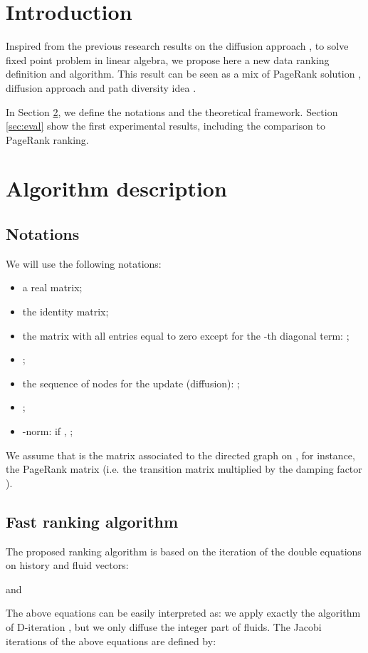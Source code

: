 \documentclass[conference]{IEEEtran}
\begin{document}
\begin{psfrags}
\section{Introduction}\label{sec:intro}
Inspired from the previous research results on the diffusion approach \cite{d-algo}, \cite{cv}
to solve fixed point problem in linear algebra, we propose here a new data ranking definition
and algorithm. This result can be seen as a mix of PageRank solution \cite{page}, diffusion approach
\cite{d-algo} and path diversity idea \cite{diversity}.

In Section \ref{sec:def}, we define the notations and the theoretical framework. 
Section \ref{sec:eval} show the first experimental results, including the comparison
to PageRank ranking.
\section{Algorithm description}\label{sec:def}
\subsection{Notations}

We will use the following notations:
\begin{itemize}
\item  a real matrix;
\item  the identity matrix;
\item  the matrix with all entries equal to zero except for
  the -th diagonal term: ;
\item ;
\item  the sequence of nodes for the update
  (diffusion): ;
\item ;
\item -norm: if , ;
\end{itemize}

We assume that  is the matrix associated to the directed graph on ,
for instance, the PageRank matrix (i.e. the transition matrix multiplied by the
damping factor \cite{page}).

\subsection{Fast ranking algorithm}
The proposed ranking algorithm is based on the iteration of the double equations
on history  and fluid  vectors:


and


The above equations can be easily interpreted as: we apply exactly the algorithm of
D-iteration \cite{d-algo}, but we only diffuse the integer part of fluids.
The Jacobi iterations of the above equations are defined by:



\end{psfrags}
\end{document}
